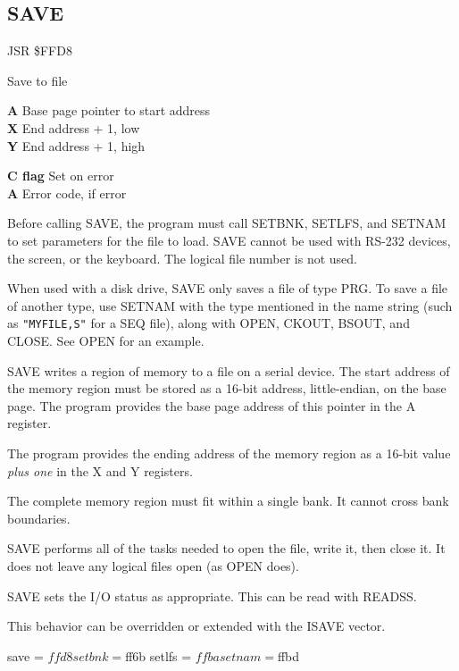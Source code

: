 
\newpage
\subsection{SAVE}
\label{KERNAL Jump Table!SAVE}
\begin{description}[leftmargin=2cm,style=nextline]
    \item [Address:] JSR \$FFD8
    \item [Description:] Save to file
    \item [Inputs:]
        \textbf{A} Base page pointer to start address \\
        \textbf{X} End address + 1, low \\
        \textbf{Y} End address + 1, high
    \item [Outputs:]
        \textbf{C flag} Set on error \\
        \textbf{A} Error code, if error
    \item [Remarks:]
        Before calling SAVE, the program must call SETBNK, SETLFS, and SETNAM to set parameters for the file to load. SAVE cannot be used with RS-232 devices, the screen, or the keyboard. The logical file number is not used.

        When used with a disk drive, SAVE only saves a file of type PRG. To save a file of another type, use SETNAM with the type mentioned in the name string (such as \texttt{"MYFILE,S"} for a SEQ file), along with OPEN, CKOUT, BSOUT, and CLOSE. See OPEN for an example.

        SAVE writes a region of memory to a file on a serial device. The start address of the memory region must be stored as a 16-bit address, little-endian, on the base page. The program provides the base page address of this pointer in the A register.

        The program provides the ending address of the memory region as a 16-bit value \emph{plus one} in the X and Y registers.

        The complete memory region must fit within a single bank. It cannot cross bank boundaries.

        SAVE performs all of the tasks needed to open the file, write it, then close it. It does not leave any logical files open (as OPEN does).

        SAVE sets the I/O status as appropriate. This can be read with READSS.

        This behavior can be overridden or extended with the ISAVE vector.
    \item [Example:]
        \begin{asmcode}
save = $ffd8
setbnk = $ff6b
setlfs = $ffba
setnam = $ffbd


\end{asmcode}
\end{description}
